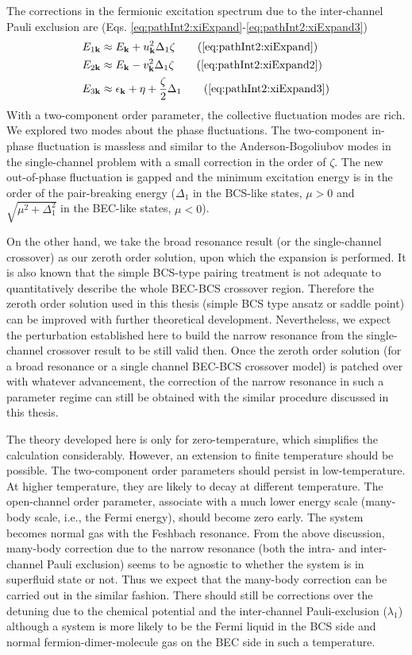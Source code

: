 The corrections in the fermionic excitation spectrum due to the inter-channel Pauli exclusion are (Eqs. \ref{eq:pathInt2:xiExpand}-\ref{eq:pathInt2:xiExpand3})
\begin{align}
E_{1\vk}&\approx{}E_{\vk}+u_{\vk}^{2}\Delta_{1}\zeta\tag{\ref{eq:pathInt2:xiExpand}}\\
E_{2\vk}&\approx{}E_{\vk}-v_{\vk}^{2}\Delta_{1}\zeta\tag{\ref{eq:pathInt2:xiExpand2}}\\
E_{3\vk}&\approx{}\epsilon_{\vk}+\eta+\frac{\zeta}{2}\Delta_{1}
\tag{\ref{eq:pathInt2:xiExpand3}}
\end{align}
With a two-component order parameter, the collective fluctuation modes are rich.  We explored two modes about the phase fluctuations.  The two-component in-phase fluctuation is massless and similar to the Anderson-Bogoliubov modes in the single-channel problem with a small correction in the order of $\zeta$.  The new out-of-phase fluctuation is gapped and the minimum excitation energy is in the order of the pair-breaking energy ($\Delta_{1}$ in the BCS-like states, $\mu>0$ and $\sqrt{\mu^{2}+\Delta_{1}^{2}}$ in the BEC-like states, $\mu<0$).  

       On the other hand, we take the broad resonance result (or the single-channel crossover) as our zeroth order solution, upon which the expansion is performed.  It is also known that the simple BCS-type pairing treatment is not adequate  to quantitatively describe the whole BEC-BCS crossover region.  Therefore the zeroth order solution used in this thesis (simple BCS type ansatz or saddle point) can be improved with further theoretical development.  Nevertheless, we expect the perturbation established here to build the narrow resonance from the single-channel crossover result to be still valid then.  Once the zeroth order solution (for a broad resonance or a single channel BEC-BCS crossover model) is patched over with whatever advancement, the correction of the narrow resonance in such a parameter regime can still be obtained with the similar procedure discussed in this thesis.  
       
       
\begin{unsure}
The theory developed here is only for zero-temperature, which simplifies the calculation considerably.  However, an extension to finite temperature should be possible.  The two-component order parameters should persist in low-temperature.  At higher temperature, they are likely to decay at different temperature.  The open-channel order parameter, associate with a much lower energy scale (many-body scale, i.e., the Fermi energy), should become zero early.  The system becomes normal gas with the Feshbach resonance.  From the above discussion, many-body correction due to the narrow resonance (both the intra- and inter-channel Pauli exclusion) seems to be agnostic to whether the system is in superfluid state or not.  Thus we expect that the many-body correction can be carried out in the similar fashion.   There should still be corrections over the detuning due to the chemical potential and the  inter-channel Pauli-exclusion ($\lambda_{1}$) although a system is more likely to be the Fermi liquid in the BCS side and normal fermion-dimer-molecule gas on the BEC side in such a temperature.   
\end{unsure}
